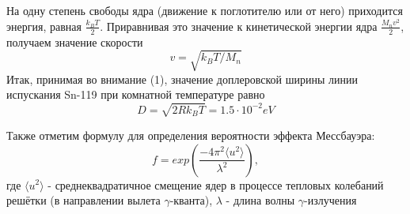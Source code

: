\documentclass[a4paper]{article}
\begin{document}
На одну степень свободы ядра (движение к поглотителю или от него) приходится энергия, равная $\frac{k_B T}{2}$. Приравнивая это значение к кинетической энергии ядра $\frac{M_n v^2}{2}$, получаем значение скорости 
\begin{equation}
    v = \sqrt{k_B T / M_n}
\end{equation}
Итак, принимая во внимание (1), значение доплеровской ширины линии испускания Sn-119 при комнатной температуре равно
\begin{equation}
    D = \sqrt{2 R k_B T} = 1.5 \cdot 10^{-2} eV
\end{equation}

Также отметим формулу для определения вероятности эффекта Мессбауэра:
\begin{equation}
    f = exp(\frac{-4\pi^2 \langle u^2 \rangle}{\lambda^2}),
\end{equation}
где $\langle u^2 \rangle$ - среднеквадратичное смещение ядер в процессе тепловых колебаний решётки (в направлении вылета $\gamma$-кванта), $\lambda$ - длина волны $\gamma$-излучения
\end{document}
